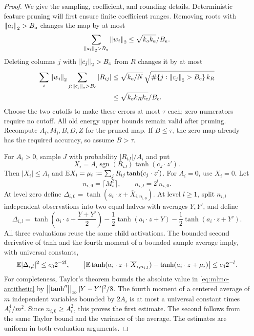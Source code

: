 \begin{proof}
We give the sampling, coefficient, and rounding details. Deterministic
feature pruning will first ensure finite coefficient ranges. Removing
roots with $\left\|a_i\right\|_2>B_a$ changes the map by at most
\[
 \sum_{\left\|a_i\right\|_2>B_a}\left\|w_i\right\|_2
       \le\sqrt{k_ok_a}/B_a.
\]
Deleting columns $j$ with $\left\|c_j\right\|_2>B_c$ from $R$ changes it by at
most
\begin{align*}
 \sum_i\left\|w_i\right\|_2\sum_{j:\left\|c_j\right\|_2>B_c}|R_{ij}|
 &\le\sqrt{k_o/N}\,
       \sqrt{\#\{j:\left\|c_j\right\|_2>B_c\}\,k_R}\\
 &\le\sqrt{k_ok_Rk_c}/B_c.
\end{align*}
Choose the two cutoffs to make these errors at most $\tau$ each;
zero numerators require no cutoff. All old energy upper bounds remain
valid after pruning. Recompute $A_i,M_i,B,D,Z$ for the pruned map.
If $B\le\tau$, the zero map already has the required accuracy, so
assume $B>\tau$.

For $A_i>0$, sample $J$ with probability $|R_{iJ}|/A_i$ and put
\[
 X_i=A_i\operatorname{sgn}(R_{iJ})\tanh(c_J\cdot z').
\]
Then $|X_i|\le A_i$ and
$\mathbb E X_i=\mu_i:=\sum_jR_{ij}\tanh(c_j\cdot z')$.
For $A_i=0$, use $X_i=0$. Let
\[
 n_{i,0}=\lceil M_i^2\rceil,\qquad n_{i,l}=2^l n_{i,0}.
\]
At level zero define
$\Delta_{i,0}=\tanh(a_i\cdot z+\overline X_{i,n_{i,0}})$.
At level $l\ge1$, split $n_{i,l}$ independent observations into two
equal halves with averages $Y,Y'$, and define
\begin{equation}\label{eq:mlmc-antithetic}
 \Delta_{i,l}=
 \tanh\left(a_i\cdot z+\frac{Y+Y'}2\right)
 -\frac12\tanh(a_i\cdot z+Y)
 -\frac12\tanh(a_i\cdot z+Y').
\end{equation}
All three evaluations reuse the same child activations. The bounded
second derivative of tanh and the fourth moment of a bounded sample
average imply, with universal constants,
\begin{equation}\label{eq:mlmc-level-estimates}
 \mathbb E|\Delta_{i,l}|^2\le c_3 2^{-2l},\qquad
 \left|\mathbb E\tanh(a_i\cdot z+\overline X_{i,n_{i,l}})
             -\tanh(a_i\cdot z+\mu_i)\right|
       \le c_4 2^{-l}.
\end{equation}
For completeness, Taylor's theorem bounds the absolute value in
\eqref{eq:mlmc-antithetic} by
$\left\|\tanh''\right\|_\infty|Y-Y'|^2/8$.
The fourth moment of a centered average of $m$ independent variables
bounded by $2A_i$ is at most a universal constant times $A_i^4/m^2$.
Since $n_{i,0}\ge A_i^2$, this proves the first estimate. The second
follows from the same Taylor bound and the variance of the average.
The estimates are uniform in both evaluation arguments.


\end{proof}
